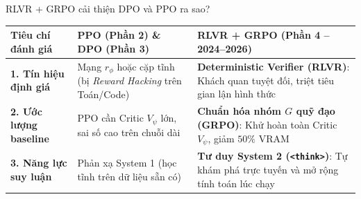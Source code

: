 \begin{frame}{RLVR + GRPO cải thiện DPO và PPO ra sao?}
  \vspace{0.05cm}
  \small
  \renewcommand{\arraystretch}{1.20}
  \begin{tabularx}{\textwidth}{@{}p{3.2cm} X X@{}}
    \toprule
    \textbf{Tiêu chí đánh giá} & \textbf{PPO (Phần 2) \& DPO (Phần 3)} & \textbf{RLVR + GRPO (Phần 4 -- 2024--2026)} \\
    \midrule
    \textbf{1. Tín hiệu định giá} & Mạng $r_\phi$ hoặc cặp tĩnh (bị \textit{Reward Hacking} trên Toán/Code) & \textbf{\textcolor{tealgreen}{Deterministic Verifier (RLVR)}}: Khách quan tuyệt đối, triệt tiêu gian lận hình thức \\

    \textbf{2. Ước lượng baseline} & PPO cần Critic $V_\psi$ lớn, sai số cao trên chuỗi dài & \textbf{\textcolor{tealgreen}{Chuẩn hóa nhóm $G$ quỹ đạo (GRPO)}}: Khử hoàn toàn Critic $V_\psi$, giảm $50\%$ VRAM \\

    \textbf{3. Năng lực suy luận} & Phản xạ System 1 (học tĩnh trên dữ liệu sẵn có) & \textbf{\textcolor{tealgreen}{Tư duy System 2 (\texttt{<think>})}}: Tự khám phá trực tuyến và mở rộng tính toán lúc chạy \\
    \bottomrule
  \end{tabularx}
  \par\vspace{0pt}
\end{frame}

